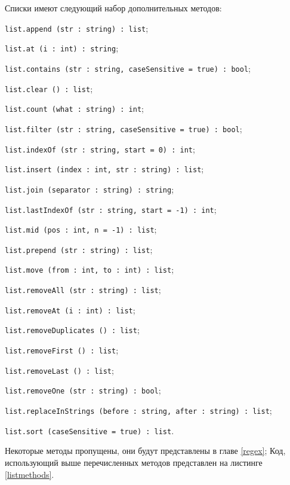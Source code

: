 Списки имеют следующий набор дополнительных методов:
\begin{icItems}
\item \lstinline|list.append (str : string) : list|;
\item \lstinline|list.at (i : int) : string|;
\item \lstinline|list.contains (str : string, caseSensitive = true) : bool|;
\item \lstinline|list.clear () : list|;
\item \lstinline|list.count (what : string) : int|;
\item \lstinline|list.filter (str : string, caseSensitive = true) : bool|;
\item \lstinline|list.indexOf (str : string, start = 0) : int|;
\item \lstinline|list.insert (index : int, str : string) : list|;
\item \lstinline|list.join (separator : string) : string|;
\item \lstinline|list.lastIndexOf (str : string, start = -1) : int|;
\item \lstinline|list.mid (pos : int, n = -1) : list|;
\item \lstinline|list.prepend (str : string) : list|;
\item \lstinline|list.move (from : int, to : int) : list|;
\item \lstinline|list.removeAll (str : string) : list|;
\item \lstinline|list.removeAt (i : int) : list|;
\item \lstinline|list.removeDuplicates () : list|;
\item \lstinline|list.removeFirst () : list|;
\item \lstinline|list.removeLast () : list|;
\item \lstinline|list.removeOne (str : string) : bool|;
\item \lstinline|list.replaceInStrings (before : string, after : string) : list|;
\item \lstinline|list.sort (caseSensitive = true) : list|.
\end{icItems}

Некоторые методы пропущены, они будут представлены в главе \ref{regex}; Код, использующий выше перечисленных методов представлен на листинге \ref{listmethods}. 

